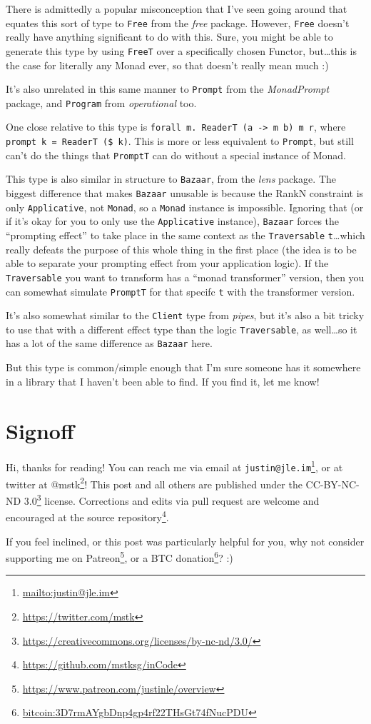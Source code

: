 \documentclass[]{article}
\renewcommand{\href}[2]{#2\footnote{\url{#1}}}
\begin{document}
There is admittedly a popular misconception that I've seen going around that
equates this sort of type to \texttt{Free} from the \emph{free} package.
However, \texttt{Free} doesn't really have anything significant to do with this.
Sure, you might be able to generate this type by using \texttt{FreeT} over a
specifically chosen Functor, but\ldots this is the case for literally any Monad
ever, so that doesn't really mean much :)

It's also unrelated in this same manner to \texttt{Prompt} from the
\emph{MonadPrompt} package, and \texttt{Program} from \emph{operational} too.

One close relative to this type is
\texttt{forall\ m.\ ReaderT\ (a\ -\textgreater{}\ m\ b)\ m\ r}, where
\texttt{prompt\ k\ =\ ReaderT\ (\$\ k)}. This is more or less equivalent to
\texttt{Prompt}, but still can't do the things that \texttt{PromptT} can do
without a special instance of Monad.

This type is also similar in structure to \texttt{Bazaar}, from the \emph{lens}
package. The biggest difference that makes \texttt{Bazaar} unusable is because
the RankN constraint is only \texttt{Applicative}, not \texttt{Monad}, so a
\texttt{Monad} instance is impossible. Ignoring that (or if it's okay for you to
only use the \texttt{Applicative} instance), \texttt{Bazaar} forces the
``prompting effect'' to take place in the same context as the
\texttt{Traversable} \texttt{t}\ldots which really defeats the purpose of this
whole thing in the first place (the idea is to be able to separate your
prompting effect from your application logic). If the \texttt{Traversable} you
want to transform has a ``monad transformer'' version, then you can somewhat
simulate \texttt{PromptT} for that specifc \texttt{t} with the transformer
version.

It's also somewhat similar to the \texttt{Client} type from \emph{pipes}, but
it's also a bit tricky to use that with a different effect type than the logic
\texttt{Traversable}, as well\ldots so it has a lot of the same difference as
\texttt{Bazaar} here.

But this type is common/simple enough that I'm sure someone has it somewhere in
a library that I haven't been able to find. If you find it, let me know!

\section{Signoff}\label{signoff}

Hi, thanks for reading! You can reach me via email at
\href{mailto:justin@jle.im}{\nolinkurl{justin@jle.im}}, or at twitter at
\href{https://twitter.com/mstk}{@mstk}! This post and all others are published
under the \href{https://creativecommons.org/licenses/by-nc-nd/3.0/}{CC-BY-NC-ND
3.0} license. Corrections and edits via pull request are welcome and encouraged
at \href{https://github.com/mstksg/inCode}{the source repository}.

If you feel inclined, or this post was particularly helpful for you, why not
consider \href{https://www.patreon.com/justinle/overview}{supporting me on
Patreon}, or a \href{bitcoin:3D7rmAYgbDnp4gp4rf22THsGt74fNucPDU}{BTC donation}?
:)
\end{document}
